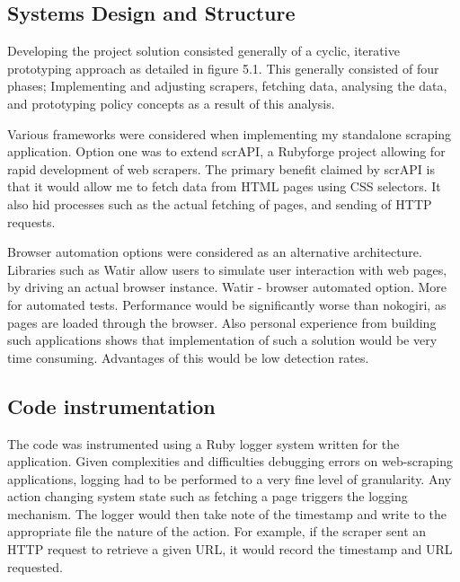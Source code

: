 \subsection{Systems Design and Structure}

Developing the project solution consisted generally of a cyclic, iterative prototyping approach as detailed in figure 5.1. This generally consisted of four phases; Implementing and adjusting scrapers, fetching data, analysing the data, and prototyping policy concepts as a result of this analysis. 

Various frameworks were considered when implementing my standalone scraping application. Option one was to extend scrAPI, a Rubyforge project allowing for rapid development of web scrapers. The primary benefit claimed by scrAPI is that it would allow me to fetch data from HTML pages using CSS selectors. It also hid processes such as the actual fetching of pages, and sending of HTTP requests. 


Browser automation options were considered as an alternative architecture. Libraries such as Watir allow users to simulate user interaction with web pages, by driving an actual browser instance. Watir - browser automated option. More for automated tests. Performance would be significantly worse than nokogiri, as pages are loaded through the browser. Also personal experience from building such applications shows that implementation of such a solution would be very time consuming. Advantages of this would be low detection rates.  


\subsection{Code instrumentation}

The code was instrumented using a Ruby logger system written for the application. Given complexities and difficulties debugging errors on web-scraping applications, logging had to be performed to a very fine level of granularity. Any action changing system state such as fetching a page triggers the logging mechanism. The logger would then take note of the timestamp and write to the appropriate file the nature of the action. For example, if the scraper sent an HTTP request to retrieve a given URL, it would record the timestamp and URL requested. 

